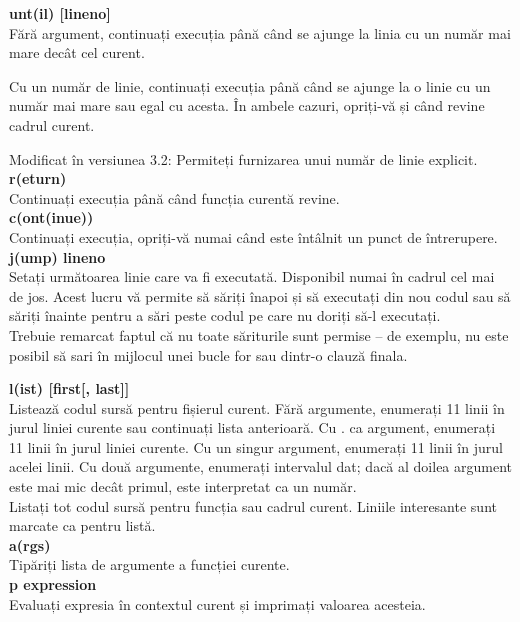 \documentclass[oneside,20pt]{article}          %
\begin{document}
\textbf{unt(il) [lineno]}\\
Fără argument, continuați execuția până când se ajunge la linia cu un număr mai mare decât cel curent.

Cu un număr de linie, continuați execuția până când se ajunge la o linie cu un număr mai mare sau egal cu acesta. În ambele cazuri, opriți-vă și când revine cadrul curent.

Modificat în versiunea 3.2: Permiteți furnizarea unui număr de linie explicit.\\

\textbf{r(eturn)}\\
Continuați execuția până când funcția curentă revine.\\

\textbf{c(ont(inue))}\\
Continuați execuția, opriți-vă numai când este întâlnit un punct de întrerupere.\\

\textbf{j(ump) lineno}\\
Setați următoarea linie care va fi executată. Disponibil numai în cadrul cel mai de jos. Acest lucru vă permite să săriți înapoi și să executați din nou codul sau să săriți înainte pentru a sări peste codul pe care nu doriți să-l executați.\\

Trebuie remarcat faptul că nu toate săriturile sunt permise – de exemplu, nu este posibil să sari în mijlocul unei bucle for sau dintr-o clauză finala.

\textbf{l(ist) [first[, last]]}\\
Listează codul sursă pentru fișierul curent. Fără argumente, enumerați 11 linii în jurul liniei curente sau continuați lista anterioară. Cu . ca argument, enumerați 11 linii în jurul liniei curente. Cu un singur argument, enumerați 11 linii în jurul acelei linii. Cu două argumente, enumerați intervalul dat; dacă al doilea argument este mai mic decât primul, este interpretat ca un număr.\\

Listați tot codul sursă pentru funcția sau cadrul curent. Liniile interesante sunt marcate ca pentru listă.\\


\textbf{a(rgs)}\\
Tipăriți lista de argumente a funcției curente.\\

\textbf{p expression}\\
Evaluați expresia în contextul curent și imprimați valoarea acesteia.\\
\end{document}
